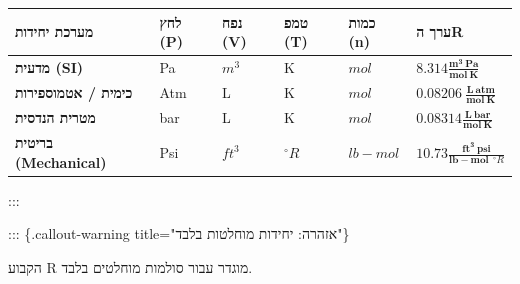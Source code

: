 \documentclass[
  hebrew,
  letterpaper,
  DIV=11,
  numbers=noendperiod]{scrreprt}
\begin{document}
\begin{longtable}[]{@{}
  >{\raggedright\arraybackslash}p{}
  >{\raggedright\arraybackslash}p{}
  >{\raggedright\arraybackslash}p{}
  >{\raggedright\arraybackslash}p{}
  >{\raggedright\arraybackslash}p{}
  >{\raggedright\arraybackslash}p{}@{}}
\toprule\noalign{}
\begin{minipage}[b]{\linewidth}\raggedright
\textbf{מערכת יחידות}
\end{minipage} & \begin{minipage}[b]{\linewidth}\raggedright
\textbf{לחץ (P)}
\end{minipage} & \begin{minipage}[b]{\linewidth}\raggedright
\textbf{נפח (V)}
\end{minipage} & \begin{minipage}[b]{\linewidth}\raggedright
\textbf{טמפ\textquotesingle{} (T)}
\end{minipage} & \begin{minipage}[b]{\linewidth}\raggedright
\textbf{כמות (n)}
\end{minipage} & \begin{minipage}[b]{\linewidth}\raggedright
\textbf{ערך הR}
\end{minipage} \\
\midrule\noalign{}
\endhead
\bottomrule\noalign{}
\endlastfoot
\textbf{מדעית (SI)} & Pa & \(m^{3}\) & K & \(mol\) &
\(\mathbf{8.314}\frac{\mathbf{m}^{\mathbf{3}}\mathbf{\ Pa}}{\mathbf{mol\ K}}\) \\
\textbf{כימית / אטמוספירות} & Atm & L & K & \(mol\) &
\(\mathbf{0.08206\ }\frac{\mathbf{L\ atm}}{\mathbf{mol\ K}}\) \\
\textbf{מטרית הנדסית} & bar & L & K & \(mol\) &
\(\mathbf{0.08314}\frac{\mathbf{L\ bar}}{\mathbf{mol\ K}}\) \\
\textbf{בריטית (Mechanical)} & Psi & \(ft^{3}\) & \({^\circ}R\) &
\(lb - mol\) &
\(\mathbf{10.73}\frac{\mathbf{f}\mathbf{t}^{\mathbf{3}}\mathbf{\ psi}}{\mathbf{lb - mol\ \ }{^\circ}R}\) \\
\end{longtable}

:::

::: \{.callout-warning title="אזהרה: יחידות מוחלטות בלבד"\}

הקבוע R מוגדר עבור סולמות מוחלטים בלבד.
\end{document}
